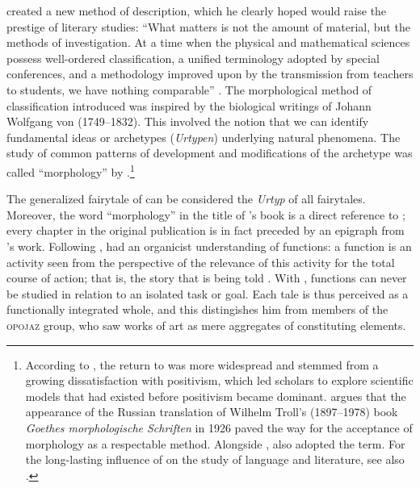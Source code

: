 \documentclass[output=paper]{langscibook}
\begin{document}
{\Propp} created a new method of description, which he clearly hoped would raise the prestige of literary studies: ``What matters is not the amount of material, but the methods of investigation. At a time when the physical and mathematical sciences possess well-ordered classification, a unified terminology adopted by special conferences, and a methodology improved upon by the transmission from teachers to students, we have nothing comparable'' \citep[4]{Propp1968}. The morphological method of classification {\Propp} introduced was inspired by the biological writings of Johann Wolfgang von {\Goethe} (1749--1832). This involved the notion that we can identify fundamental ideas or archetypes (\emph{Urtypen}) underlying natural phenomena. The study of common patterns of development and modifications of the archetype was called ``morphology'' by {\Goethe}.\footnote{According to \citet[257--258]{Steiner1984}, the return to {\Goethe} was more widespread and stemmed from a growing dissatisfaction with positivism, which led scholars to explore scientific models that had existed before positivism became dominant. \citet[13]{Oppel1947} argues that the appearance of the Russian translation of Wilhelm Troll's (1897--1978) book \emph{Goethes morphologische Schriften} in 1926 paved the way for the acceptance of morphology as a respectable method. Alongside {\Propp}, \citet{Petrovskij1927} also adopted the term. For the long-lasting influence of {\Goethe} on the study of language and literature, see also \citet{Cassirer1945}.}

The generalized fairytale of  can be considered the \emph{Urtyp} of all fairytales. Moreover, the word ``morphology'' in the title of {\Propp}'s book is a direct reference to {\Goethe}; every chapter in the original publication is in fact preceded by an epigraph from {\Goethe}'s work. Following {\Goethe}, {\Propp} had an organicist understanding of functions: a function is an activity seen from the perspective of the relevance of this activity for the total course of action; that is, the story that is being told \citep[84]{Steiner1984}. With {\Propp}, functions can never be studied in relation to an isolated task or goal. Each tale is thus perceived as a functionally integrated whole, and this distingishes him from members of the \textsc{opojaz} group, who saw works of art as mere aggregates of constituting elements.
\end{document}
